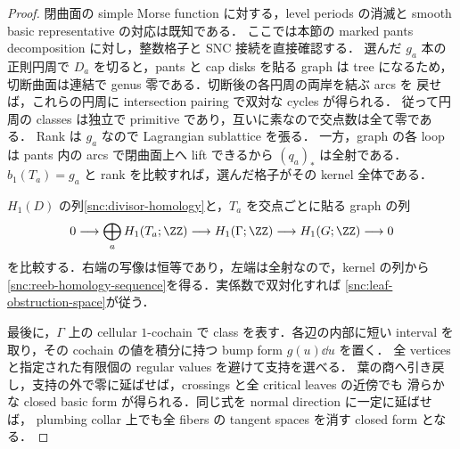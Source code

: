 \begin{proof}
閉曲面の simple Morse function に対する，level periods の消滅と smooth basic
representative の対応は既知である\cite[Lemma~4.8, p.~2421; \S5, pp.~2424--2425]{IKM}．
ここでは本節の marked pants decomposition に対し，整数格子と SNC 接続を直接確認する．
選んだ $g_a$ 本の正則円周で $D_a$ を切ると，pants と cap disks を貼る graph は tree
になるため，切断曲面は連結で genus 零である．切断後の各円周の両岸を結ぶ arcs を
戻せば，これらの円周に intersection pairing で双対な cycles が得られる．
従って円周の classes は独立で primitive であり，互いに素なので交点数は全て零である．
Rank は $g_a$ なので Lagrangian sublattice を張る．
一方，graph の各 loop は pants 内の arcs で閉曲面上へ lift できるから $(q_a)_*$ は全射である．
$b_1(T_a)=g_a$ と rank を比較すれば，選んだ格子がその kernel 全体である．

$H_1(D)$ の列\eqref{snc:divisor-homology}と，$T_a$ を交点ごとに貼る graph の列
\[
 0\longrightarrow\bigoplus_aH_1(T_a;\ZZ)
 \longrightarrow H_1(\Gamma;\ZZ)\longrightarrow H_1(G;\ZZ)\longrightarrow0
\]
を比較する．右端の写像は恒等であり，左端は全射なので，kernel の列から
\eqref{snc:reeb-homology-sequence}を得る．実係数で双対化すれば
\eqref{snc:leaf-obstruction-space}が従う．

最後に，$\Gamma$ 上の cellular $1$-cochain で class を表す．各辺の内部に短い interval
を取り，その cochain の値を積分に持つ bump form $g(u)\dd u$ を置く．
全 vertices と指定された有限個の regular values を避けて支持を選べる．
葉の商へ引き戻し，支持の外で零に延ばせば，crossings と全 critical leaves の近傍でも
滑らかな closed basic form が得られる．同じ式を normal direction に一定に延ばせば，
plumbing collar 上でも全 fibers の tangent spaces を消す closed form となる．
\end{proof}

